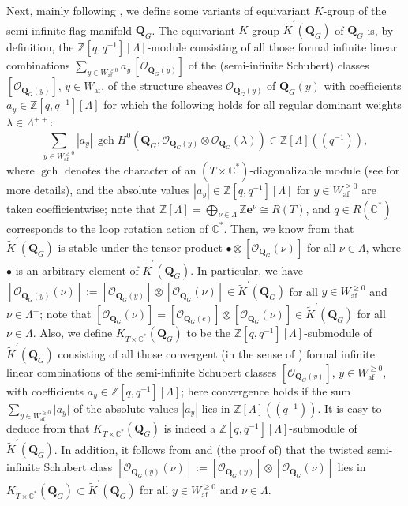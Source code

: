 \documentclass[11pt,a4paper,reqno,dvipdfmx]{amsart}
\numberwithin{equation}{section}
\newcommand{\BZ}{\mathbb{Z}}
\newcommand{\BC}{\mathbb{C}}
\newcommand{\CO}{\mathcal{O}}
\newcommand{\be}{\mathbf{e}}
\DeclareMathOperator{\gch}{gch}
\newcommand{\af}{\mathrm{af}}
\newcommand{\ti}[1]{\widetilde{#1}}
\newcommand{\pra}[1]{(\!(#1)\!)}
\newcommand{\QG}{\mathbf{Q}_{G}}
\theoremstyle{plain}
\theoremstyle{definition}
\theoremstyle{remark}
\begin{document}
Next, mainly following \cite[\S1.5]{Kat2}, 
we define some variants of equivariant $K$-group of 
the semi-infinite flag manifold $\QG$. 
The equivariant $K$-group $\ti{K}^{\prime}(\QG)$ of $\QG$ is, 
by definition, the $\BZ[q, q^{-1}][\Lambda]$-module consisting of 
all those formal infinite linear combinations 
$\sum_{y \in W_{\af}^{\geq 0}} a_{y} \, [\CO_{\QG(y)}]$ of 
the (semi-infinite Schubert) classes $[\CO_{\QG(y)}]$, $y \in W_{\af}$, 
of the structure sheaves $\CO_{\QG(y)}$ of $\QG(y)$ 
with coefficients $a_{y} \in \BZ[q, q^{-1}][\Lambda]$ for 
which the following holds for all regular dominant weights 
$\lambda \in \Lambda^{++}$: 
%
\begin{equation*}
\sum_{y \in W_{\af}^{\geq 0}} |a_{y}| \, 
\gch H^{0}(\QG, \CO_{\QG(y)} \otimes \CO_{\QG}(\lambda)) \in \BZ[\Lambda]\pra{q^{-1}}, 
\end{equation*}
%
where $\gch$ denotes the character of an $(T \times \BC^{*})$-diagonalizable module 
(see \cite[Corollary~4.31]{KaNS} for more details), 
and the absolute values $|a_{y}| \in \BZ[q, q^{-1}][\Lambda]$ 
for $y \in W_{\af}^{\geq 0}$ are taken coefficientwise; 
note that $\BZ[\Lambda] = \bigoplus_{\nu \in \Lambda} \BZ\be^{\nu} \cong R(T)$, 
and $q \in R(\BC^{*})$ corresponds to the loop rotation action of $\BC^{*}$. 
Then, we know from \cite[Theorem~1.25]{Kat2} that $\ti{K}^{\prime}(\QG)$ is 
stable under the tensor product $\bullet \otimes [\CO_{\QG}(\nu)]$ 
for all $\nu \in \Lambda$, where $\bullet$ is an arbitrary element of 
$\ti{K}^{\prime}(\QG)$. In particular, we have 
$[\CO_{\QG(y)}(\nu)] := [\CO_{\QG(y)}] \otimes [\CO_{\QG}(\nu)] \in \ti{K}^{\prime}(\QG)$ 
for all $y \in W_{\af}^{\geq 0}$ and $\nu \in \Lambda^{+}$; 
note that $[\CO_{\QG}(\nu)] = [\CO_{\QG(e)}] \otimes [\CO_{\QG}(\nu)] 
\in \ti{K}^{\prime}(\QG)$ for all $\nu \in \Lambda$. 
Also, we define $K_{T \times \BC^{*}}(\QG)$ to be the $\BZ[q, q^{-1}][\Lambda]$-submodule of 
$\ti{K}^{\prime}(\QG)$ consisting of 
all those convergent (in the sense of \cite[Proposition~5.11]{KaNS}) 
formal infinite linear combinations of the semi-infinite Schubert classes $[\CO_{\QG(y)}]$, 
$y \in W_{\af}^{\geq 0}$, with coefficients $a_{y} \in \BZ[q, q^{-1}][\Lambda]$; 
here convergence holds if the sum $\sum_{y \in W_{\af}^{\geq 0}} \vert a_{y} \vert$ 
of the absolute values $|a_{y}|$ lies in $\BZ[\Lambda]\pra{ q^{-1} }$. 
It is easy to deduce from \cite[Corollary~4.31]{KaNS} that 
$K_{T \times \BC^{*}}(\QG)$ is indeed a $\BZ[q, q^{-1}][\Lambda]$-submodule of 
$\ti{K}^{\prime}(\QG)$. In addition, it follows from \cite[Theorem~5.16]{KoLN} 
and (the proof of) \cite[Corollary~5.12]{KaNS} that 
the twisted semi-infinite Schubert class 
$[\CO_{\QG(y)}(\nu)] := [\CO_{\QG(y)}] \otimes [\CO_{\QG}(\nu)]$ 
lies in $K_{T \times \BC^{\ast}}(\QG) \subset \widetilde{K}^{\prime}(\QG)$ 
for all $y \in W_{\af}^{\geq 0}$ and $\nu \in \Lambda$. 
\end{document}

